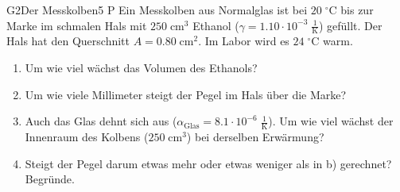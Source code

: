 \documentclass[11pt]{article}
\begin{document}
\begin{lpaufgabe}{G2}{Der Messkolben}{5 P}
Ein Messkolben aus Normalglas ist bei \(20\;^\circ\text{C}\) bis zur Marke im schmalen Hals mit \(250\;\text{cm}^3\) Ethanol (\(\gamma = 1.10 \cdot 10^{-3}\;\tfrac{1}{\text{K}}\)) gefüllt. Der Hals hat den Querschnitt \(A = 0.80\;\text{cm}^2\). Im Labor wird es \(24\;^\circ\text{C}\) warm.
\begin{enumerate}[label=\alph*),leftmargin=*,itemsep=2pt,topsep=2pt]
\item Um wie viel wächst das Volumen des Ethanols?
\item Um wie viele Millimeter steigt der Pegel im Hals über die Marke?
\item Auch das Glas dehnt sich aus (\(\alpha_\text{Glas} = 8.1 \cdot 10^{-6}\;\tfrac{1}{\text{K}}\)). Um wie viel wächst der Innenraum des Kolbens (\(250\;\text{cm}^3\)) bei derselben Erwärmung?
\item Steigt der Pegel darum etwas mehr oder etwas weniger als in b) gerechnet? Begründe.
\end{enumerate}
\end{lpaufgabe}
\end{document}
